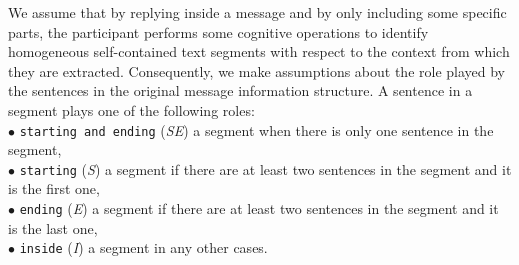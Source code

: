 We assume that by replying inside a message and by only including some specific parts, the participant performs some cognitive operations to identify homogeneous self-contained text segments
with respect to the context from which they are extracted. 
Consequently, we make assumptions about the role played by the sentences in the original message information structure.
%
A sentence in a segment plays one of the following roles: \\
\indent $\bullet$ \texttt{\footnotesize starting and ending} (\textit{SE}) a segment when there is only one sentence in the segment, \\
\indent $\bullet$ \texttt{\footnotesize starting} (\textit{S}) a segment if there are at least two sentences in the segment and it is the first one, \\
\indent $\bullet$ \texttt{\footnotesize ending} (\textit{E}) a segment if there are at least two sentences in the segment and it is the last one, \\
\indent $\bullet$ \texttt{\footnotesize inside} (\textit{I}) a segment in any other cases.
%



